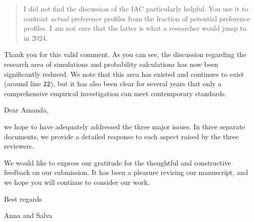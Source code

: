 \documentclass[a4paper, 12pt]{scrartcl}
\begin{document}
\begin{quotation}
I did not find the discussion of the IAC particularly helpful. You use it to contrast \textit{actual}
preference profiles from the fraction of potential preference profiles. I am not sure that the
latter is what a researcher would jump to in 2024.
\end{quotation}

Thank you for this valid comment. As you can see, the discussion regarding the research area of simulations and probability calculations has now been significantly reduced. We note that this area has existed and continues to exist (around line \texttt{22}), but it has also been clear for several years that only a comprehensive empirical investigation can meet contemporary standards.

\hspace{0.8cm}

Dear Amanda, 

we hope to have adequately addressed the three major issues. In three separate documents, we provide a detailed response to each aspect raised by the three reviewers. 

We would like to express our gratitude for the thoughtful and constructive feedback on our submission. It has been a pleasure revising our manuscript, and we hope you will continue to consider our work. 


Best regards

\hspace{.6cm}

Anna and Salva

\newpage



\end{document}
